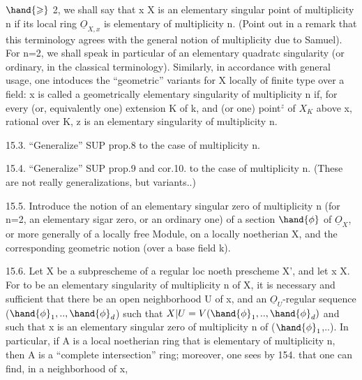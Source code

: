 
$\hand{\geqslant}$ 2, we shall say that x \hand{$\in$} X is an elementary singular point of multiplicity
n if its local ring $\underline{O}_{X,x}$ is elementary of multiplicity n. (Point out
in a remark that this  terminology agrees with the general notion
of multiplicity due to Samuel). For n=2, we shall speak in particular
of an elementary quadratc singularity (or ordinary, in the classical
terminology). Similarly, in accordance with general usage, one intoduces
the ``geometric'' variants for X locally of finite type over a field:
x  is called a geometrically elementary singularity of multiplicity n if,
for every (or, equivalently one) extension K of k, and 
(or one) point$^{z}$ of $X_{K}$ above x, rational over K, z is an
elementary singularity of multiplicity n.

15.3. ``Generalize'' SUP prop.8 to the case of multiplicity n.

15.4. ``Generalize'' SUP prop.9 and cor.10. to the case of multiplicity n.
(These are not really generalizations, but variants..)

15.5. Introduce the notion of an elementary singular zero of multiplicity
n (for n=2, an elementary  sigar zero, or an ordinary one) of a
section $\hand{\phi}$ of $\underline{O}_{X}$, or more generally of a locally free Module, on
a locally noetherian X, and the corresponding geometric notion
(over a base field k).

15.6. Let X be a subprescheme of a regular loc noeth prescheme X', and
let x \hand{$\in$}X. For  to be an elementary singularity of multiplicity
n of X, it is necessary and sufficient that there be an open neighborhood U of x, and an
$\underline{O}_{U}$-regular sequence ($\hand{\phi}_{1},..,\hand{\phi}_{d}$) such that $X|U = V(\hand{\phi}_{1},..,\hand{\phi}_{d})$ and
such that x is an elementary singular zero of multiplicity n of ($\hand{\phi}_{1}$,..).
In particular, if A is a local noetherian ring that is elementary
 of multiplicity n, then A is a ``complete intersection'' ring; moreover,
one sees by 154. that one can find, in a neighborhood of x,

